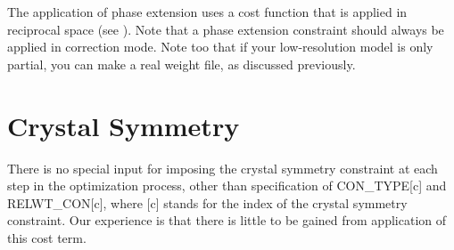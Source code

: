 \documentclass{report}
\begin{document}
{The application of phase extension uses a cost function that is applied in 
reciprocal space (see \cite{eden7}).  Note that a phase extension constraint 
should always be applied in correction mode.
Note too that if your low-resolution model is only partial, you can make a
real weight file, as discussed previously.

% 
% 
% 
% 
% 
% 
% 
% 
\section {Crystal Symmetry}
\label{constraints-cs}

There is no special input for imposing the crystal symmetry constraint at
each step in the optimization process, other than specification of 
CON\_TYPE[c] and RELWT\_CON[c], where [c] stands for the index of the 
crystal symmetry constraint.  Our experience is that there is
little to be gained from application of this cost term.

}
\end{document}
